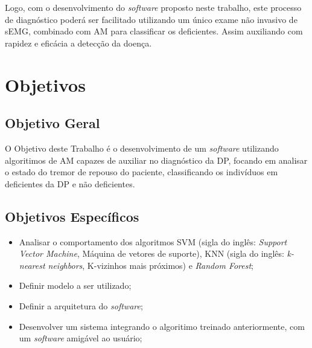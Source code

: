Logo, com o desenvolvimento do \textit{software} proposto neste trabalho, este processo de diagnóstico poderá ser facilitado utilizando um único exame não invasivo de sEMG, combinado com AM para classificar os deficientes. Assim auxiliando com rapidez e eficácia a detecção da doença. 

\section{Objetivos} 
\subsection{Objetivo Geral} 
O Objetivo deste Trabalho é o desenvolvimento de um \textit{software} utilizando algoritimos de AM capazes de auxiliar no diagnóstico da DP, focando em analisar o estado do tremor de repouso do paciente, classificando os indivíduos em deficientes da DP e não deficientes. 

\subsection{Objetivos Específicos}
\begin{itemize}
    \item Analisar o comportamento dos algoritmos SVM (sigla do inglês: \textit{Support Vector Machine}, Máquina de vetores de suporte), KNN (sigla do inglês: \textit{k-nearest neighbors}, K-vizinhos mais próximos) e \textit{Random Forest};
    \item Definir modelo a ser utilizado;
    \item Definir a arquitetura do \textit{software};
    \item Desenvolver um sistema integrando o algoritimo treinado anteriormente, com um \textit{software} amigável ao usuário;
\end{itemize}
